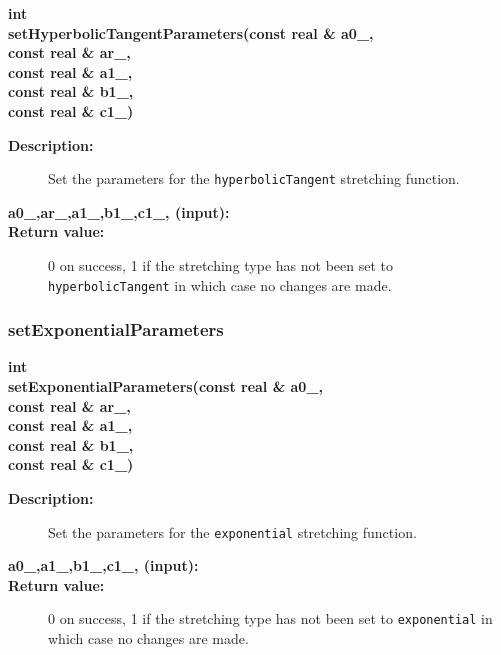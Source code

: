 \begin{flushleft} \textbf{%
int  \\ 
\settowidth{\StretchMappingIncludeArgIndent}{setHyperbolicTangentParameters(}%
setHyperbolicTangentParameters(const real \& a0\_,\\ 
\hspace{\StretchMappingIncludeArgIndent}const real \& ar\_, \\ 
\hspace{\StretchMappingIncludeArgIndent}const real \& a1\_, \\ 
\hspace{\StretchMappingIncludeArgIndent}const real \& b1\_, \\ 
\hspace{\StretchMappingIncludeArgIndent}const real \& c1\_)
}\end{flushleft}
\begin{description}
\item[{\bf Description:}]  
    Set the parameters for the {\tt hyperbolicTangent} stretching
   function.
\item[{\bf a0\_,ar\_,a1\_,b1\_,c1\_, (input):}] 
\item[{\bf Return value:}]  0 on success, 1 if the stretching type has not been set to {\tt hyperbolicTangent}
   in which case no changes are made.  
\end{description}
\subsubsection{setExponentialParameters}
 
\begin{flushleft} \textbf{%
int  \\ 
\settowidth{\StretchMappingIncludeArgIndent}{setExponentialParameters(}%
setExponentialParameters(const real \& a0\_, \\ 
\hspace{\StretchMappingIncludeArgIndent}const real \& ar\_, \\ 
\hspace{\StretchMappingIncludeArgIndent}const real \& a1\_, \\ 
\hspace{\StretchMappingIncludeArgIndent}const real \& b1\_, \\ 
\hspace{\StretchMappingIncludeArgIndent}const real \& c1\_)
}\end{flushleft}
\begin{description}
\item[{\bf Description:}]  
    Set the parameters for the {\tt exponential} stretching
   function.
\item[{\bf a0\_,a1\_,b1\_,c1\_, (input):}] 
\item[{\bf Return value:}]  0 on success, 1 if the stretching type has not been set to {\tt exponential}
   in which case no changes are made.  
\end{description}
